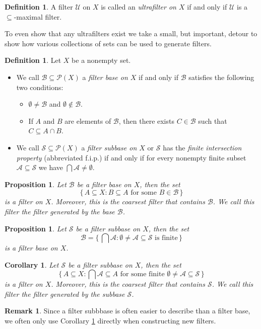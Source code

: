 \documentclass[12pt]{article}
\theoremstyle{plain}
\newtheorem{prop}[thm]{Proposition}
\newtheorem{cor}[thm]{Corollary}
\theoremstyle{definition}
\newtheorem{defn}[thm]{Definition}
\newtheorem{rmk}[thm]{Remark}
\newcommand{\calA}{\mathcal{A}}
\newcommand{\calB}{\mathcal{B}}
\newcommand{\calP}{\mathcal{P}}
\newcommand{\calS}{\mathcal{S}}
\newcommand{\calU}{\mathcal{U}}
\begin{document}
\begin{defn}
  A filter $\calU$ on $X$ is called an \textsl{ultrafilter on $X$} if and only if $\calU$ is a \mbox{$\subseteq$-maximal} filter.
\end{defn}

To even show that any ultrafilters exist we take a small, but important, detour to show how various collections of sets can be used to generate filters.

\begin{defn}
  Let $X$ be a nonempty set.
  \begin{itemize}
    \item[(a)] We call $\calB \subseteq \calP(X)$ a \textsl{filter base on $X$} if and only if $\calB$ satisfies the following two conditions:
    \begin{itemize}
      \item[(1)] $\emptyset \ne \calB$ and $\emptyset \not\in \calB$.
        
      \item[(2)] If $A$ and $B$ are elements of $\calB$, then there exists $C \in \calB$ such that $C \subseteq A \cap B$.
    \end{itemize}

    \item[(b)] We call $\calS \subseteq \calP(X)$ a \textsl{filter subbase on $X$} or $\calS$ has the \textsl{finite intersection property} (abbreviated f.i.p.) if and only if for every nonempty finite subset $\calA \subseteq \calS$ we have $\bigcap \calA \ne \emptyset$.
  \end{itemize}
\end{defn}

\begin{prop}
  \label{prop:fltBase}
  Let $\calB$ be a filter base on $X$, then the set
  \[
    \{\, A \subseteq X : \mbox{$B \subseteq A$ for some $B \in \calB$} \,\}
  \]
  is a filter on $X$.
  Moreover, this is the coarsest filter that contains $\calB$.
  We call this filter the \textsl{filter generated by the base $\calB$}.
\end{prop}

\begin{prop}
  Let $\calS$ be a filter subbase on $X$, then the set
  \[
     \calB = \bigl\{\, \bigcap \calA : \mbox{$\emptyset \ne \calA \subseteq \calS$ is finite} \,\bigr\}
  \]
  is a filter base on $X$. 
\end{prop}
\begin{cor}
  \label{cor:fltSubbase}
  Let $\calS$ be a filter subbase on $X$, then the set
  \[
    \{\, A \subseteq X : \mbox{$\bigcap\calA \subseteq A$ for some finite $\emptyset \ne \calA \subseteq \calS$} \,\}
  \]
  is a filter on $X$.
  Moreover, this is the coarsest filter that contains $\calS$.
  We call this filter the \textsl{filter generated by the subbase $\calS$}.
\end{cor}
\begin{rmk}
  Since a filter subbbase is often easier to describe than a filter base, we often only use Corollary \ref{cor:fltSubbase} directly when constructing new filters.
\end{rmk}
\end{document}
